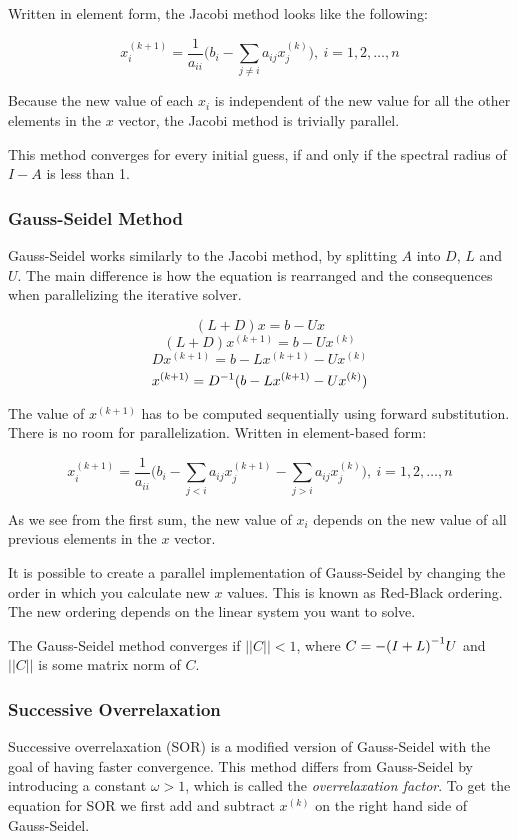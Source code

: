 Written in element form, the Jacobi method looks like the following:

$$ x_i^{(k+1)} = \frac{1}{a_{ii}} \Big( b_i - \sum_{j \neq i} a_{ij} x_j^{(k)} \Big), ~ i = 1, 2, \ldots, n $$

Because the new value of each $x_i$ is independent of the new value for all the 
other elements in the $x$ vector, the Jacobi method is trivially parallel.

This method converges for every initial guess, if and only if the spectral
radius of $I - A$ is less than 1\cite{Kreyszig}.

\subsubsection{Gauss-Seidel Method}

Gauss-Seidel works similarly to the Jacobi method, by splitting $A$ into $D$, 
$L$ and $U$. The main difference is how the equation is rearranged and the consequences 
when parallelizing the iterative solver. 

$$ (L+D)x = b - Ux $$
$$ (L+D)x^{(k+1)} = b - Ux^{(k)} $$
$$ Dx^{(k+1)} = b - Lx^{(k+1)} - Ux^{(k)} $$
$$ x^{(k+1)} = {D}^{-1}(b - Lx^{(k+1)} - Ux^{(k)}) $$

The value of $x^{(k+1)}$ has to be computed sequentially using forward substitution. 
There is no room for parallelization. Written in element-based form:

$$ x_i^{(k+1)} = \frac{1}{a_{ii}} \Big( b_i - \sum_{j < i} a_{ij} x_j^{(k+1)} 
- \sum_{j > i} a_{ij} x_j^{(k)} \Big), ~ i = 1, 2, \ldots, n $$

As we see from the first sum, the new value of $x_i$ depends on the new value of 
all previous elements in the $x$ vector.

It is possible to create a parallel implementation of Gauss-Seidel by changing
the order in which you calculate new $x$ values. This is known as Red-Black
ordering. The new ordering depends on the linear system you want to solve.

The Gauss-Seidel method converges if $||C|| < 1$, where $C = -{(I+L)}^{-1}U$ and 
$||C||$ is some matrix norm of $C$\cite{Kreyszig}.

\subsubsection{Successive Overrelaxation}

Successive overrelaxation (SOR) is a modified version of Gauss-Seidel with the
goal of having faster convergence\cite{Kreyszig}. This method differs from Gauss-Seidel by
introducing a constant $\omega > 1$, which is called the \emph{overrelaxation
factor}. To get the equation for SOR we first add and subtract $x^{(k)}$ on the right 
hand side of Gauss-Seidel.

